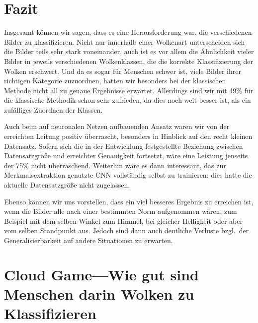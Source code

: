 \documentclass[a4,german]{article}
\begin{document}
\section{Fazit}
\label{sec:fazit}


Insgesamt können wir sagen, dass es eine Herausforderung war, die verschiedenen Bilder zu klassifizieren.
Nicht nur innerhalb einer Wolkenart unterscheiden sich die Bilder teils sehr stark voneinander, auch ist es vor allem die Ähnlichkeit vieler Bilder in jeweils verschiedenen Wolkenklassen, die die korrekte Klassifizierung der Wolken erschwert.
Und da es sogar für Menschen schwer ist, viele Bilder ihrer richtigen Kategorie zuzuordnen, hatten wir besonders bei der klassischen Methode nicht all zu genaue Ergebnisse erwartet.
Allerdings sind wir mit 49\% für die klassische Methodik schon sehr zufrieden, da dies noch weit besser ist, als ein zufälliges Zuordnen der Klassen.

Auch beim auf neuronalen Netzen aufbauenden Ansatz waren wir von der erreichten Leitung positiv überrascht, besonders in Hinblick auf den recht kleinen Datensatz.
Sofern sich die in der Entwicklung festgestellte Beziehung zwischen Datensatzgröße und erreichter Genauigkeit fortsetzt, wäre eine Leistung jenseits der 75\% nicht überraschend.
Weiterhin wäre es dann interessant, das zur Merkmalsextraktion genutzte CNN vollständig selbst zu trainieren; dies hatte die aktuelle Datensatzgröße nicht zugelassen.

Ebenso können wir uns vorstellen, dass ein viel besseres Ergebnis zu erreichen ist, wenn die Bilder alle nach einer bestimmten Norm aufgenommen wären, zum Beispiel mit dem selben Winkel zum Himmel, bei gleicher Helligkeit oder aber vom selben Standpunkt aus.
Jedoch sind dann auch deutliche Verluste bzgl.\ der Generalisierbarkeit auf andere Situationen zu erwarten.




\pagebreak
\appendix
\section{Cloud Game---Wie gut sind Menschen darin Wolken zu Klassifizieren}
\end{document}
